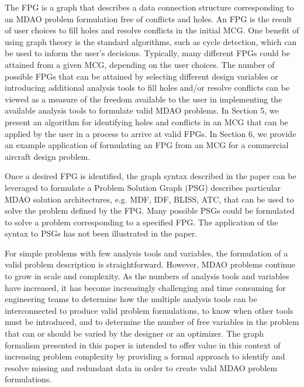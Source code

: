 The FPG is a graph that describes a data connection structure corresponding to an MDAO problem formulation free of conflicts and holes.  
An FPG is the result of user choices to fill holes and resolve conflicts in the initial MCG.  
One benefit of using graph theory is the standard algorithms, such as cycle detection, which can be used to inform the user's decisions.
Typically, many different FPGs could be attained from a given MCG, depending on the user choices.  
The number of possible FPGs that can be attained by selecting different design variables or introducing additional analysis tools to fill holes and/or resolve conflicts can be viewed as a measure of the freedom available to the user in implementing the available analysis tools to formulate valid MDAO problems.  
In Section 5, we present an algorithm for identifying holes and conflicts in an MCG that can be applied by the user in a process to arrive at valid FPGs.  
In Section 6, we provide an example application of formulating an FPG from an MCG for a commercial aircraft design problem.

Once a desired FPG is identified, the graph syntax described in the paper can be leveraged to formulate a Problem Solution Graph (PSG) describes particular MDAO solution architectures, e.g. MDF, IDF, BLISS, ATC, that can be used to solve the problem defined by the FPG.  
Many possible PSGs could be formulated to solve a problem corresponding to a specified FPG.   
The application of the syntax to PSGs has not been illustrated in the paper.

For simple problems with few analysis tools and variables, the formulation of a valid problem description is straightforward.  
However, MDAO problems continue to grow in scale and complexity.  
As the numbers of analysis tools and variables have increased, it has become increasingly challenging and time consuming for engineering teams to determine how the multiple analysis tools can be interconnected to produce valid problem formulations, to know when other tools must be introduced, and to determine the number of free variables in the problem that can or should be varied by the designer or an optimizer.  
The graph formalism presented in this paper is intended to offer value in this context of increasing problem complexity by providing a formal approach to identify and resolve missing and redundant data in order to create valid MDAO problem formulations.  


